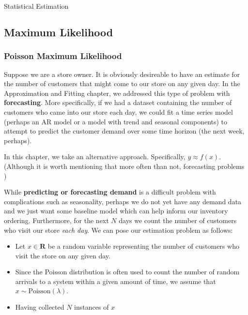 \begin{chapter}{Statistical Estimation}

    \subsection{Maximum Likelihood}

    \subsubsection{Poisson Maximum Likelihood}

    Suppose we are a store owner. It is obviously desireable to have an estimate for the number of customers
    that might come to our store on any given day. In the Approximation and Fitting chapter, we addressed this type
    of problem with \textbf{forecasting}. More specifically, if we had a dataset containing the number of customers
    who came into our store each day, we could fit a time series model (perhaps an AR model or a model with trend and seasonal components) to attempt to predict the 
    customer demand over some time horizon (the next week, perhaps).

    In this chapter, we take an alternative approach. Specifically, $y \approx f(x)$. (Although it is worth mentioning that more often than not,
    forecasting problems )
    
    While \textbf{predicting or forecasting demand} is a 
    difficult problem with complications such as seasonality, perhaps we do not yet have any demand data and we just
    want some baseline model which can help inform our inventory ordering. Furthermore, for the next $N$ days we count the number
    of customers who visit our store \textit{each day}. We can pose our estimation problem as follows:
    \begin{itemize}
        \item Let $x \in \mathbf{R}$ be a random variable representing the number of customers who visit
        the store on any given day.
        \item Since the Poisson distribution is often used to count the number of random arrivals to
        a system within a given amount of time, we assume that $x \sim \text{Poisson}(\lambda)$.
        \item Having collected $N$ instances of $x$ %
    \end{itemize}
    

\end{chapter}
